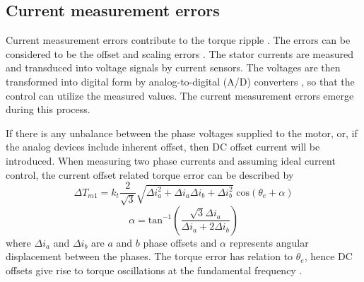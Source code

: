 \subsection{Current measurement errors}

Current measurement errors contribute to the torque ripple \cite{current_scaling:1998, ILC:2004, ILC:2005, CTR_SW_ff:2011, ILC:2012, ILC:2018}. The errors can be considered to be the offset and scaling errors \cite{current_scaling:1998, ILC:2004, CTR_SW_ff:2011, ILC:2012}. The stator currents are measured and transduced into voltage signals by current sensors. The voltages are then transformed into digital form by analog-to-digital (A/D) converters \cite{current_scaling:1998, ILC:2005}, so that the control can utilize the measured values. The current measurement errors emerge during this process.


If there is any unbalance between the phase voltages supplied to the motor, or, if the analog devices include inherent offset, then DC offset current will be introduced. When measuring two phase currents and assuming ideal current control, the current offset related torque error can be described by \cite{current_scaling:1998}
\begin{equation}
    \Delta T_{m1} = k_t \frac{2}{\sqrt{3}}\sqrt{\Delta i_a^2 + \Delta i_a \Delta i_b + \Delta i_b^2} \; \text{cos}(\theta_e + \alpha)
\end{equation}
$$\alpha = \text{tan}^{-1}\left(\frac{\sqrt{3}\Delta i_a}{\Delta i_a + 2 \Delta i_b}\right)$$
where $\Delta i_a$ and $\Delta i_b$ are $a$ and $b$ phase offsets and $\alpha$ represents angular displacement between the phases. The torque error has relation to $\theta_e$, hence DC offsets give rise to torque oscillations at the fundamental frequency \cite{current_scaling:1998, CTR_SW:1998, ILC:2004, ILC:2018}.

